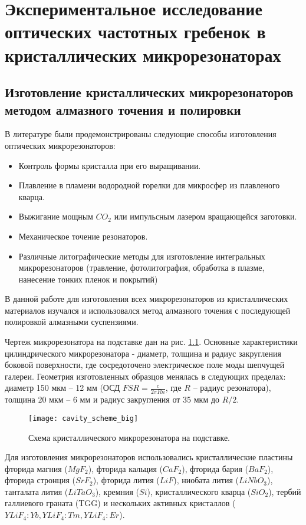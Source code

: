 \chapter{Экспериментальное исследование оптических частотных гребенок в кристаллических микрорезонаторах} \label{chapt3}

\section{Изготовление кристаллических микрорезонаторов методом алмазного точения и полировки}

В литературе были продемонстрированы следующие способы изготовления оптических микрорезонаторов:

\begin{itemize}
  \item Контроль формы кристалла при его выращивании.
  \item Плавление в пламени водородной горелки для микросфер из плавленого кварца.
  \item Выжигание мощным $CO_2$ или импульсным лазером вращающейся заготовки.
  \item Механическое точение резонаторов.
  \item Различные литографические методы для изготовление интегральных микрорезонаторов (травление, фотолитография, обработка в плазме, нанесение тонких пленок и покрытий)
\end{itemize}

В данной работе для изготовления всех микрорезонаторов из кристаллических материалов изучался и использовался метод алмазного точения с последующей полировкой алмазными суспензиями.

Чертеж микрорезонатора на подставке дан на рис. \ref{cavity_scheme_big}. Основные характеристики цилиндрического микрорезонатора - диаметр, толщина и радиус закругления боковой поверхности, где сосредоточено электрическое поле моды шепчущей галереи. Геометрия изготовленных образцов менялась в следующих пределах: диаметр 150 мкм – 12 мм (ОСД $FSR= \frac{c}{2\pi Rn}$, где $R$ – радиус резонатора), толщина 20 мкм – 6 мм и радиус закругления от 35 мкм до $R/2$.

\begin{figure}[ht]
    \centering
  \texttt{[image: cavity\_scheme\_big]}
  \caption{Схема кристаллического микрорезонатора на подставке.}
  \label{cavity_scheme_big}
\end{figure}

Для изготовления микрорезонаторов использовались кристаллические пластины фторида магния ($MgF_2$), фторида кальция ($CaF_2$), фторида бария ($BaF_2$), фторида стронция ($SrF_2$), фторида лития ($LiF$), ниобата лития ($LiNbO_3$), танталата лития ($LiTaO_3$), кремния ($Si$), кристаллического кварца ($SiO_2$), тербий галлиевого граната (TGG) и нескольких активных кристаллов ($YLiF_4:Yb, YLiF_4:Tm, YLiF_4:Er$).

